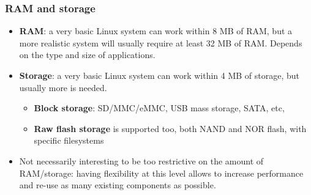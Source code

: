 \begin{frame}
  \frametitle{RAM and storage}
  \begin{itemize}
  \item {\bf RAM}: a very basic Linux system can work within 8 MB of
    RAM, but a more realistic system will usually require at least 32
    MB of RAM. Depends on the type and size of applications.
  \item {\bf Storage}: a very basic Linux system can work within 4 MB
    of storage, but usually more is needed.
    \begin{itemize}
    \item {\bf Block storage}: SD/MMC/eMMC, USB mass storage, SATA, etc,
    \item {\bf Raw flash storage} is supported too, both NAND and NOR flash, with
      specific filesystems
    \end{itemize}
  \item Not necessarily interesting to be too restrictive on the
    amount of RAM/storage: having flexibility at this level allows to
    increase performance and re-use as many existing components as possible.
  \end{itemize}
\end{frame}

